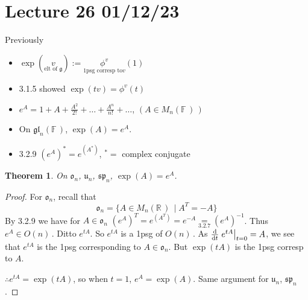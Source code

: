 \documentclass[12pt,a4paper]{article}
\newcommand{\rR}{\ensuremath{\mathbb{R}\,}}
\newcommand{\fF}{\ensuremath{\mathbb{F}\,}}
\newcommand{\mnr}{\ensuremath{M_n(\rR)\,}}
\newcommand{\mnf}{\ensuremath{M_n(\fF)\,}}
\newcommand{\gon}{\ensuremath{O(n)\,}}
\newcommand{\lglnf}{\ensuremath{\mathfrak{gl}_n(\fF)}}
\newcommand{\lgon}{\ensuremath{\mathfrak{o}_n}}
\newcommand{\lgun}{\ensuremath{\mathfrak{u}_n}}
\newcommand{\lgspn}{\ensuremath{\mathfrak{sp}_n}}
\newcommand{\lalg}{\ensuremath{\mathfrak{g}}}
\newtheorem{thm}{Theorem}[subsubsection]
\begin{document}
\section{Lecture 26 01/12/23}
Previously
\begin{itemize}
\item $\exp(\underset{\text{elt of }\lalg}{v}):=\underset{\text{1psg corresp to} v}{\phi^v}(1)$
\item 3.1.5 showed $\exp(tv)=\phi^v(t)$
\item $e^A=1+A+\frac{A^2}{2!}+\ldots +\frac{A^n}{n!}+\ldots$, $(A\in \mnf)$
\item On \lglnf, $\exp(A)=e^A$.
\item 3.2.9 $\left(e^A\right)^*=e^{(A^*)}$, $^*=$ complex conjugate
\end{itemize}

\begin{thm}
On \lgon, \lgun, \lgspn, $\exp(A)=e^A$.
\end{thm}
\begin{proof}
For \lgon, recall that 
\[\lgon=\{A \in \mnr \mid A^T=-A\}\]
By 3.2.9 we have for $A\in \lgon$ $\left(e^A\right)^T=e^{(A^T)}=e^{-A}\underset{3.2.7}{=}\left(e^A\right)^{-1}$.
Thus $e^A\in \gon$. Ditto $e^{tA}$. So $e^{tA}$ is a 1psg of  \gon. As $\dv{t}\eval{e^{tA}}_{t=0}=A$, we see that $e^{tA}$ is the 1psg corresponding to $A\in \lgon$. But $\exp(tA)$ is the 1psg corresp to $A$. 

$\therefore e^{tA}=\exp(tA)$, so when $t=1$, $e^A=\exp(A)$. Same argument for \lgun, \lgspn .
\end{proof}
\end{document}

